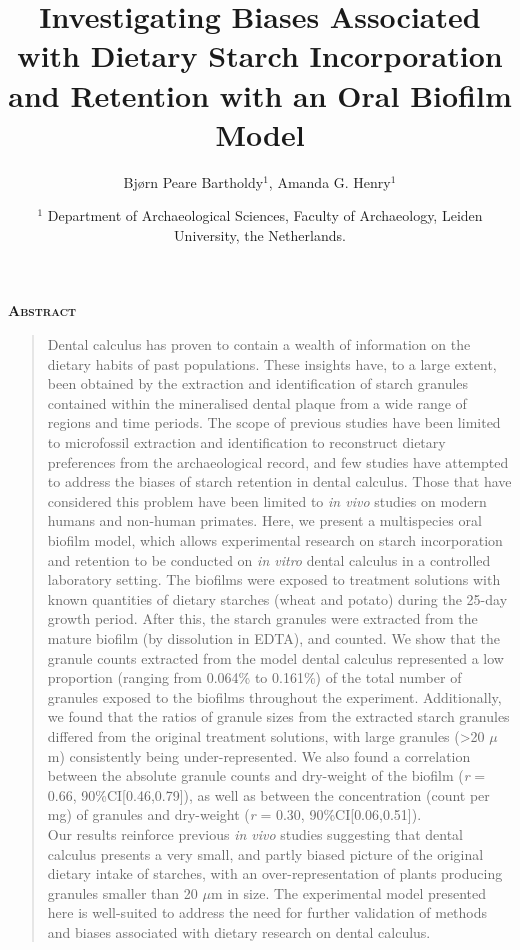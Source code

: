 \documentclass[
]{article}
\title{Investigating Biases Associated with Dietary Starch Incorporation and Retention with an Oral Biofilm Model}
\author{Bjørn Peare Bartholdy\(^1\), Amanda G. Henry\(^1\)}
\date{\(^1\) Department of Archaeological Sciences, Faculty of Archaeology, Leiden University, the Netherlands.}
\renewenvironment{abstract}
{
  \centerline
  {\large \bfseries \scshape Abstract}
  \begin{quote}
}
{
  \end{quote}
}
\begin{document}
\maketitle
\begin{abstract}
Dental calculus has proven to contain a wealth of information
on the dietary habits of past populations. These insights have, to a large extent,
been obtained by the extraction and identification of
starch granules contained within the mineralised dental plaque from a wide range
of regions and time periods. The scope of previous studies have been limited to
microfossil extraction and identification to reconstruct dietary preferences from
the archaeological record, and few studies have attempted to address the biases
of starch retention in dental calculus. Those that have considered this problem
have been limited to \emph{in vivo} studies on modern humans and non-human primates.
Here, we present a multispecies oral biofilm model, which allows experimental
research on starch incorporation and retention to be conducted on \emph{in vitro}
dental calculus in a controlled laboratory setting. The biofilms were exposed
to treatment solutions with known quantities of
dietary starches (wheat and potato) during the 25-day growth period. After this,
the starch granules were extracted from the mature biofilm (by dissolution in EDTA),
and counted. We show that the granule counts extracted from the model dental calculus
represented a low proportion (ranging from 0.064\% to 0.161\%) of the total number
of granules exposed to the biofilms throughout the experiment.
Additionally, we found that the ratios of granule sizes from the extracted
starch granules differed from the original treatment solutions, with large
granules (\textgreater20 \(\mu\)m) consistently being under-represented.
We also found a correlation
between the absolute granule counts and dry-weight of the biofilm
(\emph{r} = 0.66, 90\%CI{[}0.46,0.79{]}), as well
as between the concentration (count per mg) of granules and dry-weight
(\emph{r} = 0.30, 90\%CI{[}0.06,0.51{]}).\\
Our results reinforce previous \emph{in vivo} studies suggesting that dental calculus
presents a very small, and partly biased picture of the original dietary intake
of starches, with an over-representation of plants producing granules smaller than
20 \(\mu\)m in size. The experimental model presented here is well-suited to address
the need for further validation of methods and biases associated with dietary
research on dental calculus.
\end{abstract}
\end{document}
